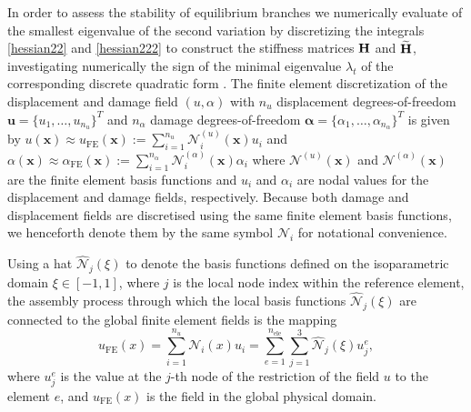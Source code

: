 In order to assess the stability of equilibrium branches we numerically evaluate of the smallest eigenvalue of the second variation by discretizing the integrals \eqref{hessian22} and   \eqref{hessian222} to construct the stiffness matrices
$\mathbf{H}$ and $\widetilde{\mathbf{H}}$, investigating numerically the sign of the minimal eigenvalue $\lambda_t$ of the corresponding discrete quadratic form \cite{Sanderson2016-ht}.  The finite element discretization of the displacement and damage field $(u, \alpha )$     with \( n_u \) displacement degrees-of-freedom
$
    \mathbf{u} = \{ u_1, \ldots, u_{n_u} \}^T
$
and \( n_\alpha \) damage degrees-of-freedom
$
    \boldsymbol{\alpha} = \{ \alpha_1, \ldots, \alpha_{n_\alpha} \}^T
$ is given by
$
    u(\mathbf{x}) \approx u_{\text{FE}} (\mathbf{x}) := \sum_{i=1}^{n_u} \mathcal{N}^{(u)}_i(\mathbf{x}) u_i $
and $\alpha(\mathbf{x}) \approx \alpha_{\text{FE}} (\mathbf{x}) := \sum_{i=1}^{n_\alpha} \mathcal{N}^{(\alpha)}_i (\mathbf{x}) \alpha_i
$
where $\mathcal{N}^{(u)}(\mathbf{x}) $ and $\mathcal{N}^{(\alpha)}(\mathbf{x}) $ are the finite element basis functions and {$u_i$} and {$\alpha_i$} are nodal values for the displacement and damage fields, respectively. {Because both damage and displacement fields are discretised using the same finite element basis functions, we henceforth denote them by the same symbol $\mathcal N_i$ for notational convenience.}

{
Using a hat $\hat{\mathcal{N}}_j(\xi)$ to denote the basis functions defined on the isoparametric domain $\xi \in [-1, 1]$, where $j$ is the local node index within the reference element, the assembly process through which the local basis functions $\hat{\mathcal{N}}_j(\xi)$ are connected to the global finite element fields is the mapping
$$u_{\text{FE}}(x) = \sum_{i=1}^{n_u} \mathcal N_i(x) u_i = \sum_{e=1}^{n_\text{ele}} \sum_{j=1}^{3} \hat{\mathcal {N}}_j(\xi) u_j^e,$$
where $u_j^e$ is the value at the $j$-th node of the restriction of the field $u$ to the element $e$, and $u_{\text{FE}}(x)$ is the field in the global physical domain.}



